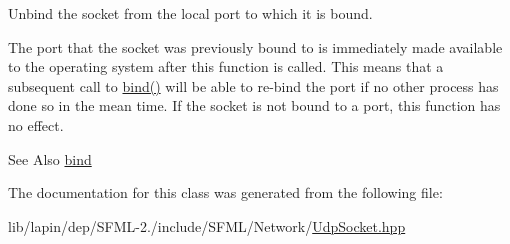 Unbind the socket from the local port to which it is bound. 

The port that the socket was previously bound to is immediately made available to the operating system after this function is called. This means that a subsequent call to \hyperlink{classsf_1_1_udp_socket_ab0bf8d32849836f92beb2fd734565481}{bind()} will be able to re-\/bind the port if no other process has done so in the mean time. If the socket is not bound to a port, this function has no effect.

\begin{DoxySeeAlso}{See Also}
\hyperlink{classsf_1_1_udp_socket_ab0bf8d32849836f92beb2fd734565481}{bind} 
\end{DoxySeeAlso}


The documentation for this class was generated from the following file\-:\begin{DoxyCompactItemize}
\item 
lib/lapin/dep/\-S\-F\-M\-L-\/2./include/\-S\-F\-M\-L/\-Network/\hyperlink{lapin_2dep_2_s_f_m_l-2_83_2include_2_s_f_m_l_2_network_2_udp_socket_8hpp}{Udp\-Socket.\-hpp}\end{DoxyCompactItemize}
